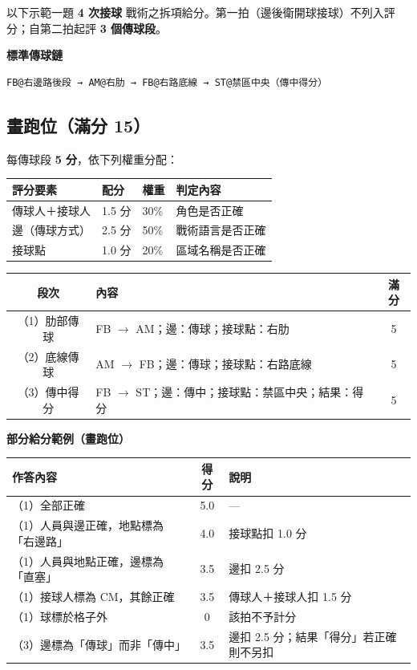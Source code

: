 \documentclass[11pt]{article}
\newcommand{\term}[1]{\textbf{#1}}
\begin{document}
以下示範一題 \term{4 次接球} 戰術之拆項給分。第一拍（邊後衛開球接球）不列入評分；自第二拍起評 \term{3 個傳球段}。

\vspace{0.4em}
\noindent\textbf{標準傳球鏈}

\begin{verbatim}
FB@右邊路後段 → AM@右肋 → FB@右路底線 → ST@禁區中央（傳中得分）
\end{verbatim}

\subsection*{畫跑位（滿分 15）}

每傳球段 \term{5 分}，依下列權重分配：

\small
\begin{tabular}{@{}llll@{}}
\toprule
\textbf{評分要素} & \textbf{配分} & \textbf{權重} & \textbf{判定內容} \\
\midrule
傳球人＋接球人 & 1.5 分 & 30\% & 角色是否正確 \\
邊（傳球方式） & 2.5 分 & 50\% & 戰術語言是否正確 \\
接球點 & 1.0 分 & 20\% & 區域名稱是否正確 \\
\bottomrule
\end{tabular}
\normalsize

\vspace{0.5em}
\begin{tabular}{@{}clc@{}}
\toprule
\textbf{段次} & \textbf{內容} & \textbf{滿分} \\
\midrule
（1）肋部傳球 & FB $\rightarrow$ AM；邊：傳球；接球點：右肋 & 5 \\
（2）底線傳球 & AM $\rightarrow$ FB；邊：傳球；接球點：右路底線 & 5 \\
（3）傳中得分 & FB $\rightarrow$ ST；邊：傳中；接球點：禁區中央；結果：得分 & 5 \\
\bottomrule
\end{tabular}

\vspace{0.6em}
\noindent\textbf{部分給分範例（畫跑位）}

\small
\begin{tabular}{@{}p{4.8cm}cp{4.5cm}@{}}
\toprule
\textbf{作答內容} & \textbf{得分} & \textbf{說明} \\
\midrule
（1）全部正確 & 5.0 & — \\
（1）人員與邊正確，地點標為「右邊路」 & 4.0 & 接球點扣 1.0 分 \\
（1）人員與地點正確，邊標為「直塞」 & 3.5 & 邊扣 2.5 分 \\
（1）接球人標為 CM，其餘正確 & 3.5 & 傳球人＋接球人扣 1.5 分 \\
（1）球標於格子外 & 0 & 該拍不予計分 \\
（3）邊標為「傳球」而非「傳中」 & 3.5 & 邊扣 2.5 分；結果「得分」若正確則不另扣 \\
\bottomrule
\end{tabular}
\normalsize
\end{document}
